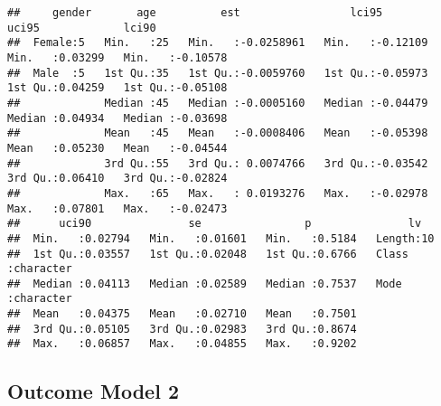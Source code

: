 \documentclass[
]{article}
\begin{document}
\begin{verbatim}
##     gender       age          est                 lci95              uci95             lci90         
##  Female:5   Min.   :25   Min.   :-0.0258961   Min.   :-0.12109   Min.   :0.03299   Min.   :-0.10578  
##  Male  :5   1st Qu.:35   1st Qu.:-0.0059760   1st Qu.:-0.05973   1st Qu.:0.04259   1st Qu.:-0.05108  
##             Median :45   Median :-0.0005160   Median :-0.04479   Median :0.04934   Median :-0.03698  
##             Mean   :45   Mean   :-0.0008406   Mean   :-0.05398   Mean   :0.05230   Mean   :-0.04544  
##             3rd Qu.:55   3rd Qu.: 0.0074766   3rd Qu.:-0.03542   3rd Qu.:0.06410   3rd Qu.:-0.02824  
##             Max.   :65   Max.   : 0.0193276   Max.   :-0.02978   Max.   :0.07801   Max.   :-0.02473  
##      uci90               se                p               lv           
##  Min.   :0.02794   Min.   :0.01601   Min.   :0.5184   Length:10         
##  1st Qu.:0.03557   1st Qu.:0.02048   1st Qu.:0.6766   Class :character  
##  Median :0.04113   Median :0.02589   Median :0.7537   Mode  :character  
##  Mean   :0.04375   Mean   :0.02710   Mean   :0.7501                     
##  3rd Qu.:0.05105   3rd Qu.:0.02983   3rd Qu.:0.8674                     
##  Max.   :0.06857   Max.   :0.04855   Max.   :0.9202
\end{verbatim}

\hypertarget{outcome-model-2-3}{%
\subsection{Outcome Model 2}\label{outcome-model-2-3}}
\end{document}
